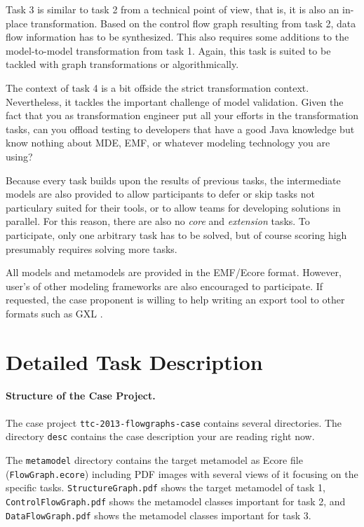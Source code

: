\documentclass[10pt]{article}
\begin{document}
Task 3 is similar to task 2 from a technical point of view, that is, it is also
an in-place transformation.  Based on the control flow graph resulting from
task 2, data flow information has to be synthesized.  This also requires some
additions to the model-to-model transformation from task 1.  Again, this task
is suited to be tackled with graph transformations or algorithmically.

The context of task 4 is a bit offside the strict transformation context.
Nevertheless, it tackles the important challenge of model validation.  Given
the fact that you as transformation engineer put all your efforts in the
transformation tasks, can you offload testing to developers that have a good
Java knowledge but know nothing about MDE, EMF, or whatever modeling technology
you are using?

Because every task builds upon the results of previous tasks, the intermediate
models are also provided to allow participants to defer or skip tasks not
particulary suited for their tools, or to allow teams for developing solutions
in parallel.  For this reason, there are also no \emph{core} and
\emph{extension} tasks.  To participate, only one arbitrary task has to be
solved, but of course scoring high presumably requires solving more tasks.


All models and metamodels are provided in the EMF/Ecore format.  However,
user's of other modeling frameworks are also encouraged to participate.  If
requested, the case proponent is willing to help writing an export tool to
other formats such as GXL \cite{GXL02}.


\section{Detailed Task Description}
\label{sec:task-descr}

\paragraph{Structure of the Case Project.}

The case project \verb|ttc-2013-flowgraphs-case| contains several directories.
The directory \verb|desc| contains the case description your are reading right
now.

The \verb|metamodel| directory contains the target metamodel as Ecore file
(\verb|FlowGraph.ecore|) including PDF images with several views of it focusing
on the specific tasks.  \verb|StructureGraph.pdf| shows the target metamodel of
task 1, \verb|ControlFlowGraph.pdf| shows the metamodel classes important for
task 2, and \verb|DataFlowGraph.pdf| shows the metamodel classes important for
task 3.
\end{document}
